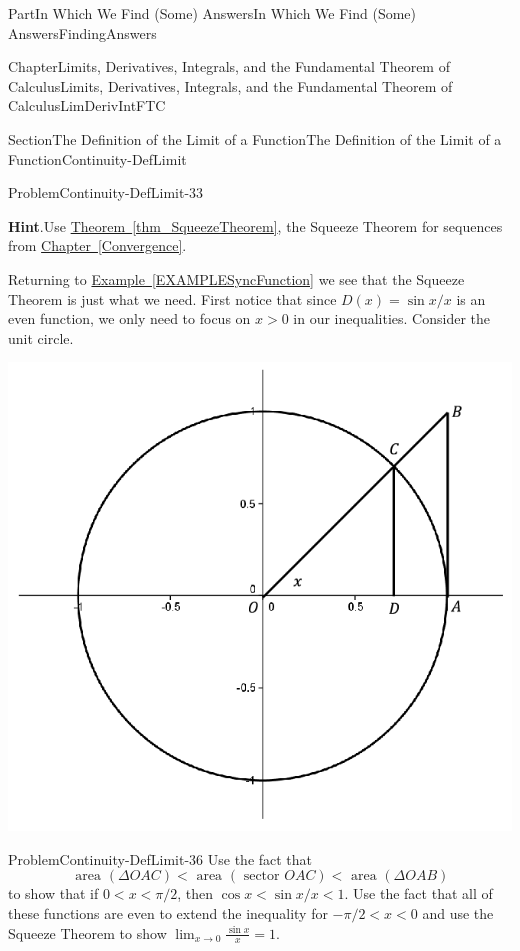 \documentclass[oneside,10pt,]{book}
\newcommand{\blocktitlefont}{\relax}
\newcommand{\xreffont}{\relax}
\numberwithin{equation}{part}
\def\limit#1#2#3{{\displaystyle\lim_{#1\rightarrow #2}#3}}
\newcommand{\lt}{<}
\begin{document}
\begin{partptx}{Part}{In Which We Find (Some) Answers}{}{In Which We Find (Some) Answers}{}{}{FindingAnswers}
\begin{chapterptx}{Chapter}{Limits, Derivatives, Integrals, and the Fundamental Theorem of Calculus}{}{Limits, Derivatives, Integrals, and the Fundamental Theorem of Calculus}{}{}{LimDerivIntFTC}
\begin{sectionptx}{Section}{The Definition of the Limit of a Function}{}{The Definition of the Limit of a Function}{}{}{Continuity-DefLimit}
\begin{problem}{Problem}{}{Continuity-DefLimit-33}
\par\smallskip%
\noindent\textbf{\blocktitlefont Hint}.\hypertarget{Continuity-DefLimit-33-2}{}\quad{}Use \hyperref[thm_SqueezeTheorem]{Theorem~{\xreffont\ref{thm_SqueezeTheorem}}}, the Squeeze Theorem for sequences from \hyperref[Convergence]{Chapter~{\xreffont\ref{Convergence}}}.%
\end{problem}
Returning to \hyperref[EXAMPLESyncFunction]{Example~{\xreffont\ref{EXAMPLESyncFunction}}} we see that the Squeeze Theorem is just what we need.  First notice that since \(D(x)=\sin x/x\) is an even function, we only need to focus on \(x>0\) in our inequalities.  Consider the unit circle.%
\begin{image}{0.2}{0.6}{0.2}{}%
\includegraphics[width=\linewidth]{external/images/UnitCircle.png}
\end{image}%
\begin{problem}{Problem}{}{Continuity-DefLimit-36}%
Use the fact that%
\begin{equation*}
\text{ area } (\Delta OAC)\lt \text{ area } (\text{ sector }
OAC)\lt \text{ area } (\Delta OAB) 
\end{equation*}
to show that if \(0\lt
x\lt \pi/2\), then \(\cos x\lt \sin x/x\lt 1\).  Use the fact that all of these functions are even to extend the inequality for \(-\pi/2\lt x\lt 0\) and use the Squeeze Theorem to show \(\limit{x}{0}{\textstyle\frac{\sin
x}{x}}=1\).%
\end{problem}

\end{sectionptx}
\end{chapterptx}
\end{partptx}
\end{document}
